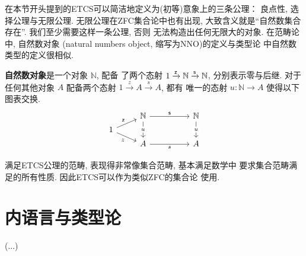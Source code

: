 在本节开头提到的ETCS可以简洁地定义为(初等)意象上的三条公理：
良点性, 选择公理与无限公理. 无限公理在ZFC集合论中也有出现,
大致含义就是“自然数集合存在”. 我们至少需要这样一条公理, 否则
无法构造出任何无限大的对象. 在范畴论中, 自然数对象
(natural numbers object, 缩写为NNO)的定义与类型论
中自然数类型的定义很相似.
\begin{definition}
\textbf{自然数对象}是一个对象 \(\mathbb N\), 配备
了两个态射 \(1 \xrightarrow{\textnormal{\textsf{z}}} \mathbb N \xrightarrow{\textnormal{\textsf{s}}} \mathbb N\),
分别表示零与后继. 对于任何其他对象 \(A\) 配备两个态射
\(1 \xrightarrow z A \xrightarrow s A\), 都有
唯一的态射 \(u : \mathbb N \to A\) 使得以下图表交换.
\[\begin{tikzcd}[row sep=3]
& {\mathbb N} && {\mathbb N} \\
1 \\
& A && A
\arrow["z"', from=2-1, to=3-2]
\arrow["s"', from=3-2, to=3-4]
\arrow["{\cons{z}}", from=2-1, to=1-2]
\arrow["{\cons{s}}", from=1-2, to=1-4]
\arrow["u"{description}, from=1-2, to=3-2]
\arrow["u"{description}, from=1-4, to=3-4]
\end{tikzcd}\]
\end{definition}
满足ETCS公理的范畴, 表现得非常像集合范畴, 基本满足数学中
要求集合范畴满足的所有性质. 因此ETCS可以作为类似ZFC的集合论
使用.

\section{内语言与类型论}

(...)
